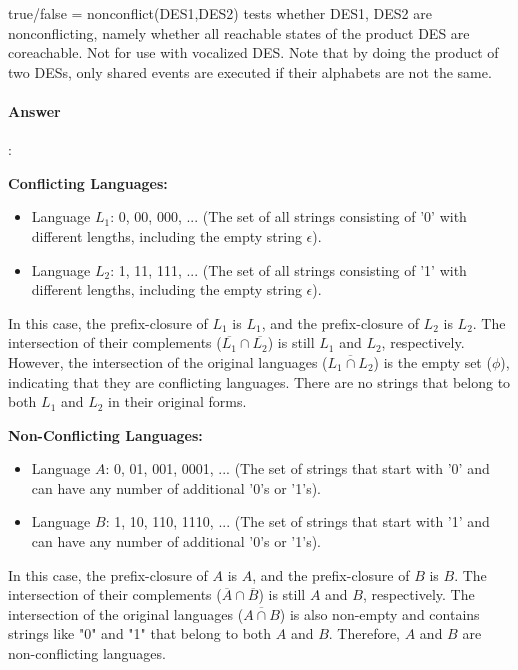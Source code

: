 \documentclass{article}
\begin{document}
\begin{tcolorbox}
  true/false = nonconflict(DES1,DES2) tests whether DES1, DES2 are nonconflicting, namely whether all reachable states of the product DES are coreachable. Not for use with vocalized DES. Note that by doing the product of two DESs, only shared events are executed if their alphabets are not the same.
\end{tcolorbox}

\paragraph{Answer}:

\textbf{Conflicting Languages:}

\begin{itemize}
  \item Language $L_1$: {0, 00, 000, ...} (The set of all strings consisting of '0' with different lengths, including the empty string $\epsilon$).
  \item Language $L_2$: {1, 11, 111, ...} (The set of all strings consisting of '1' with different lengths, including the empty string $\epsilon$).
\end{itemize}

In this case, the prefix-closure of $L_1$ is $L_1$, and the prefix-closure of $L_2$ is $L_2$. The intersection of their complements ($\overline{L_1} \cap \overline{L_2}$) is still $L_1$ and $L_2$, respectively. However, the intersection of the original languages ($\overline{L_1 \cap L_2}$) is the empty set ($\phi $), indicating that they are conflicting languages. There are no strings that belong to both $L_1$ and $L_2$ in their original forms.

\textbf{Non-Conflicting Languages:}

\begin{itemize}
  \item Language $A$: {0, 01, 001, 0001, ...} (The set of strings that start with '0' and can have any number of additional '0's or '1's).
  \item Language $B$: {1, 10, 110, 1110, ...} (The set of strings that start with '1' and can have any number of additional '0's or '1's).
\end{itemize}

In this case, the prefix-closure of $A$ is $A$, and the prefix-closure of $B$ is $B$. The intersection of their complements ($\overline{A} \cap \overline{B}$) is still $A$ and $B$, respectively. The intersection of the original languages ($\overline{A \cap B}$) is also non-empty and contains strings like "0" and "1" that belong to both $A$ and $B$. Therefore, $A$ and $B$ are non-conflicting languages.
\end{document}
